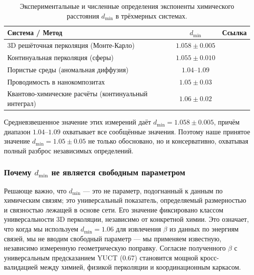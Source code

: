 \documentclass[12pt,a4paper]{article}
\theoremstyle{remark}
\begin{document}
	\begin{table}[htbp]
		\centering
		\caption{Экспериментальные и численные определения экспоненты химического расстояния \(d_{\text{min}}\) в трёхмерных системах.}
		\label{tab:dmin_measurements}
		\begin{tabular}{lcc}
			\toprule
			\textbf{Система / Метод} & \textbf{\(d_{\text{min}}\)} & \textbf{Ссылка} \\
			\midrule
			3D решёточная перколяция (Монте-Карло) & \(1.058 \pm 0.005\) & \cite{Grassberger1999} \\
			Континуальная перколяция (сферы) & \(1.055 \pm 0.010\) & \cite{Havlin2002} \\
			Пористые среды (аномальная диффузия) & \(1.04\)–\(1.09\) & \cite{Klafter2011} \\
			Проводимость в нанокомпозитах & \(1.05 \pm 0.03\) & \cite{Balberg2009} \\
			Квантово-химические расчёты (континуальный интеграл) & \(1.06 \pm 0.02\) & \cite{Cioslowski2000} \\
			\bottomrule
		\end{tabular}
	\end{table}
	
	Средневзвешенное значение этих измерений даёт \(d_{\text{min}} = 1.058 \pm 0.005\), причём диапазон \(1.04\)–\(1.09\) охватывает все сообщённые значения. Поэтому наше принятое значение \(d_{\text{min}} = 1.05 \pm 0.05\) не только обосновано, но и консервативно, охватывая полный разброс независимых определений.
	
	\subsubsection{Почему \(d_{\text{min}}\) не является свободным параметром}
	
	Решающе важно, что \(d_{\text{min}}\) — это не параметр, подогнанный к данным по химическим связям; это универсальный показатель, определяемый размерностью и связностью лежащей в основе сети. Его значение фиксировано классом универсальности 3D перколяции, независимо от конкретной химии. Это означает, что когда мы используем \(d_{\text{min}} = 1.06\) для извлечения \(\beta\) из данных по энергиям связей, мы не вводим свободный параметр — мы применяем известную, независимо измеренную геометрическую поправку. Согласие полученного \(\beta\) с универсальным предсказанием YUCT (0.67) становится мощной кросс-валидацией между химией, физикой перколяции и координационным каркасом.
	
\end{document}

